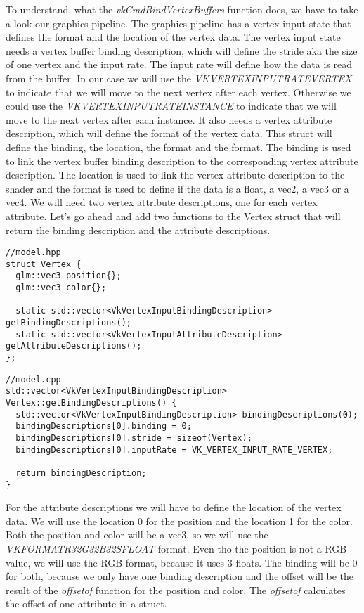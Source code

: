 \documentclass[12pt]{report} \usepackage{preamble}
\begin{document}
To understand, what the \textit{vkCmdBindVertexBuffers} function does, we have to take a look our graphics pipeline.
The graphics pipeline has a vertex input state that defines the format and the location of the vertex data.
The vertex input state needs a vertex buffer binding description, which will define the stride aka the size of one vertex and the input rate.
The input rate will define how the data is read from the buffer.
In our case we will use the \textit{VK\textunderscore VERTEX\textunderscore INPUT\textunderscore RATE\textunderscore VERTEX} to indicate that
we will move to the next vertex after each vertex. Otherwise we could use the \textit{VK\textunderscore VERTEX\textunderscore INPUT\textunderscore RATE\textunderscore INSTANCE}
to indicate that we will move to the next vertex after each instance.
It also needs a vertex attribute description, which will define the format of the vertex data. This struct will define the binding, the location, the format and the format.
The binding is used to link the vertex buffer binding description to the corresponding vertex attribute description. The location is used to link the vertex attribute description to the shader
and the format is used to define if the data is a float, a vec2, a vec3 or a vec4. We will need two vertex attribute descriptions, one for each vertex attribute.
Let's go ahead and add two functions to the Vertex struct that will return the binding description and the attribute descriptions.

\begin{lstlisting}[Language=C++]
//model.hpp
struct Vertex {
  glm::vec3 position{};
  glm::vec3 color{};

  static std::vector<VkVertexInputBindingDescription> getBindingDescriptions();
  static std::vector<VkVertexInputAttributeDescription> getAttributeDescriptions();
};
\end{lstlisting}

\begin{lstlisting}[Language=C++]
//model.cpp
std::vector<VkVertexInputBindingDescription> Vertex::getBindingDescriptions() {
  std::vector<VkVertexInputBindingDescription> bindingDescriptions(0);
  bindingDescriptions[0].binding = 0;
  bindingDescriptions[0].stride = sizeof(Vertex);
  bindingDescriptions[0].inputRate = VK_VERTEX_INPUT_RATE_VERTEX;

  return bindingDescription;
}
\end{lstlisting}

For the attribute descriptions we will have to define the location of the vertex data. We will use the location 0 for the position and the location 1 for the color.
Both the position and color will be a vec3, so we will use the \textit{VK\textunderscore FORMAT\textunderscore R32G32B32\textunderscore SFLOAT} format.
Even tho the position is not a RGB value, we will use the RGB format, because it uses 3 floats.
The binding will be 0 for both, because we only have one binding description and the offset will be the result of the \textit{offsetof} function for the position and color.
The \textit{offsetof} calculates the offset of one attribute in a struct.
\end{document}
